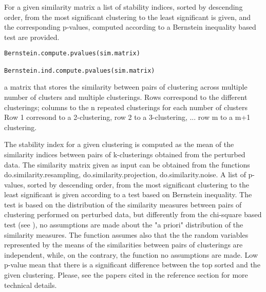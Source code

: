 \documentclass{article}
\begin{document}
\begin{Description}\relax
For a given similarity matrix a list of stability indices, sorted by descending order, from the most significant
clustering to the least significant is given, and the corresponding p-values, computed according to a Bernstein inequality based test are  provided.
\end{Description}
\begin{Usage}
\begin{verbatim}
Bernstein.compute.pvalues(sim.matrix)

Bernstein.ind.compute.pvalues(sim.matrix)
\end{verbatim}
\end{Usage}
\begin{Arguments}
\begin{ldescription}
\item[\code{sim.matrix}] a matrix that stores the similarity between pairs of clustering across multiple number of clusters
and multiple clusterings.
Rows correspond to the different clusterings; columns to the n repeated clusterings for each number of clusters
Row 1 corresond to a 2-clustering, row 2 to a 3-clustering, ... row m to a m+1 clustering. 
\end{ldescription}
\end{Arguments}
\begin{Details}\relax
The stability index for a given clustering is computed as the mean of the similarity indices between pairs of 
k-clusterings obtained from the perturbed data. The similarity matrix given as input can be obtained from the functions
do.similarity.resampling, do.similarity.projection, do.similarity.noise. 
A list of p-values, sorted by descending order, from the most significant
clustering to the least significant is given according to a test based on Bernstein inequality. 
The test is based on the distribution of the similarity measures between pairs of clustering performed on perturbed data,
but differently from the chi-square based test (see ), no assumptions are made
about the "a priori" distribution of the similarity measures.
The function  assumes also that the the random variables represented by the means
of the similarities between pairs of clusterings are independent, while, on the contrary, 
the function  no assumptions are made.
Low p-value mean that there is a significant difference between the 
top sorted and the given clustering. Please, see the papers cited in the reference section for more technical details.
\end{Details}
\end{document}
